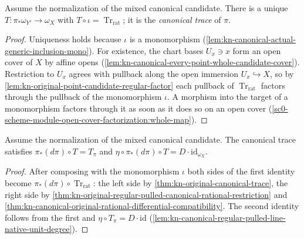 \begin{theorem}
\label{thm:kn-original-canonical-trace}
\leanok
Assume the normalization of the mixed canonical candidate. There is a unique
$T:\pi_*\omega_{Y'}\to\omega_X$ with $T\circ\iota=\operatorname{Tr}_{\mathrm{rat}}$;
it is the \emph{canonical trace} of $\pi$.
\end{theorem}
\begin{proof}
Uniqueness holds because $\iota$ is a monomorphism
(\cref{lem:kn-canonical-actual-generic-inclusion-mono}). For existence, the
chart bases $U_x\ni x$ form an open cover of $X$ by affine opens
(\cref{lem:kn-canonical-every-point-whole-candidate-cover}). Restriction to
$U_x$ agrees with pullback along the open immersion $U_x\hookrightarrow X$, so
by \cref{lem:kn-original-point-candidate-regular-factor} each pullback of
$\operatorname{Tr}_{\mathrm{rat}}$ factors through the pullback of the
monomorphism $\iota$. A morphism into the target of a monomorphism factors
through it as soon as it does so on an open cover
(\cref{sc0-scheme-module-open-cover-factorization:whole-map}).
\end{proof}

\begin{theorem}
\label{thm:kn-original-canonical-trace-degree}
\leanok
Assume the normalization of the mixed canonical candidate. The canonical trace
satisfies $\pi_*(d\pi)\circ T=T_\pi$ and
$\eta\circ\pi_*(d\pi)\circ T=D\cdot\mathrm{id}_{\omega_X}$.
\end{theorem}
\begin{proof}
After composing with the monomorphism $\iota$ both sides of the first identity
become $\pi_*(d\pi)\circ\operatorname{Tr}_{\mathrm{rat}}$: the left side by
\cref{thm:kn-original-canonical-trace}, the right side by
\cref{thm:kn-original-regular-pulled-canonical-rational-restriction} and
\cref{thm:kn-canonical-original-rational-differential-compatibility}. The second
identity follows from the first and $\eta\circ T_\pi=D\cdot\mathrm{id}$
(\cref{lem:kn-canonical-regular-pulled-line-native-unit-degree}).
\end{proof}

